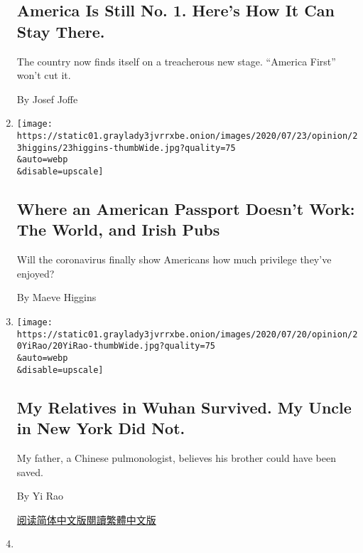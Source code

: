 \begin{enumerate}
  \hypertarget{america-is-still-no-1-heres-how-it-can-stay-there}{%
  \subsection{America Is Still No. 1. Here's How It Can Stay
  There.}\label{america-is-still-no-1-heres-how-it-can-stay-there}}

  The country now finds itself on a treacherous new stage. ``America
  First'' won't cut it.

  By Josef Joffe
\item
  \href{/2020/07/23/opinion/passport-coronavirus-travel.html}{}

  \texttt{[image: https://static01.graylady3jvrrxbe.onion/images/2020/07/23/opinion/23higgins/23higgins-thumbWide.jpg?quality=75\\\&auto=webp\\\&disable=upscale]}

  \hypertarget{where-an-american-passport-doesnt-work-the-world-and-irish-pubs}{%
  \subsection{Where an American Passport Doesn't Work: The World, and
  Irish
  Pubs}\label{where-an-american-passport-doesnt-work-the-world-and-irish-pubs}}

  Will the coronavirus finally show Americans how much privilege they've
  enjoyed?

  By Maeve Higgins
\item
  \href{/2020/07/22/opinion/coronavirus-china-us.html}{}

  \texttt{[image: https://static01.graylady3jvrrxbe.onion/images/2020/07/20/opinion/20YiRao/20YiRao-thumbWide.jpg?quality=75\\\&auto=webp\\\&disable=upscale]}

  \hypertarget{my-relatives-in-wuhan-survived-my-uncle-in-new-york-did-not}{%
  \subsection{My Relatives in Wuhan Survived. My Uncle in New York Did
  Not.}\label{my-relatives-in-wuhan-survived-my-uncle-in-new-york-did-not}}

  My father, a Chinese pulmonologist, believes his brother could have
  been saved.

  By Yi Rao

  \href{https://cn.nytimes3xbfgragh.onion/opinion/20200723/coronavirus-china-us/}{阅读简体中文版}\href{https://cn.nytimes3xbfgragh.onion/opinion/20200723/coronavirus-china-us/zh-hant/}{閱讀繁體中文版}
\item
  \href{/2020/07/21/opinion/china-iran.html}{}


\end{enumerate}
